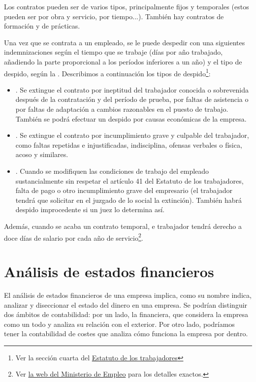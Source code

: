 \documentclass[nochap,palatino,shortheader]{apuntes}
\begin{document}
Los contratos pueden ser de varios tipos, principalmente fijos y temporales (estos pueden ser por obra y servicio, por tiempo...). También hay contratos de formación y de prácticas.

Una vez que se contrata a un empleado, se le puede despedir con una siguientes indemnizaciones según el tiempo que se trabaje (días por año trabajado, añadiendo la parte proporcional a los períodos inferiores a un año) y el tipo de despido, según la . Describimos a continuación los tipos de despido\footnote{Ver la sección cuarta del \href{https://www.boe.es/buscar/act.php?id=BOE-A-1995-7730&tn=1&p=20151024}{Estatuto de los trabajadores}}:

\begin{itemize}
\item {}. Se extingue el contrato por ineptitud del trabajador conocida o sobrevenida después de la contratación y del período de prueba, por faltas de asistencia o por faltas de adaptación a cambios razonables en el puesto de trabajo. También se podrá efectuar un despido por causas económicas de la empresa.
\item {}. Se extingue el contrato por incumplimiento grave y culpable del trabajador, como faltas repetidas e injustificadas, indisciplina, ofensas verbales o física, acoso y similares.
\item {}. Cuando se modifiquen las condiciones de trabajo del empleado sustancialmente sin respetar el artículo 41 del Estatuto de los trabajadores, falta de pago o otro incumplimiento grave del empresario (el trabajador tendrá que solicitar en el juzgado de lo social la extinción). También habrá despido improcedente si un juez lo determina así.
\end{itemize}

Además, cuando se acaba un contrato temporal, e trabajador tendrá derecho a doce días de salario por cada año de servicio\footnote{Ver \href{http://www.empleo.gob.es/es/Guia/texto/guia_7/contenidos/guia_7_16_4.htm}{la web del Ministerio de Empleo} para los detalles exactos.}.

\section{Análisis de estados financieros}

El análisis de estados financieros de una empresa implica, como su nombre indica, analizar y diseccionar el estado del dinero en una empresa. Se podrían distinguir dos ámbitos de contabilidad: por un lado, la financiera, que considera la empresa como un todo y analiza su relación con el exterior. Por otro lado, podríamos tener la contabilidad de costes que analiza cómo funciona la empresa por dentro.
\end{document}
